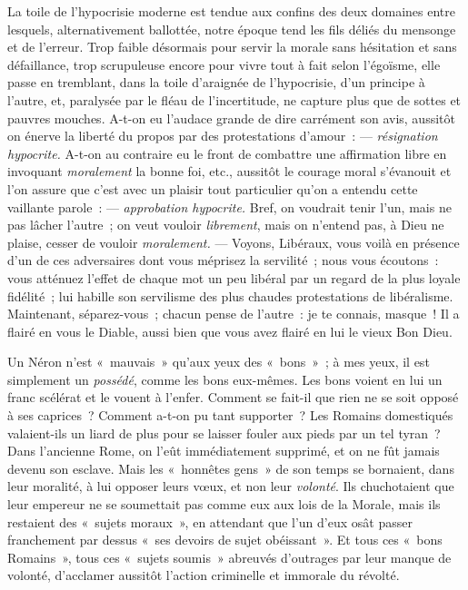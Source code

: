 \documentclass[french,twoside]{book} %
\begin{document}
La toile de l’hypocrisie moderne est tendue aux confins des deux domaines entre lesquels, alternativement ballottée, notre époque tend les fils déliés du mensonge et de l’erreur. Trop faible désormais pour servir la morale sans hésitation et sans défaillance, trop scrupuleuse encore pour vivre tout à fait selon l’égoïsme, elle passe en tremblant, dans la toile d’araignée de l’hypocrisie, d’un principe à l’autre, et, paralysée par le fléau de l’incertitude, ne capture plus que de sottes et pauvres mouches. A-t-on eu l’audace grande de dire carrément son avis, aussitôt on énerve la liberté du propos par des protestations d’amour : — \emph{résignation hypocrite.} A-t-on au contraire eu le front de combattre une affirmation libre en invoquant \emph{moralement} la bonne foi, etc., aussitôt le courage  moral s’évanouit et l’on assure que c’est avec un plaisir tout particulier qu’on a entendu cette vaillante parole : — \emph{approbation hypocrite.} Bref, on voudrait tenir l’un, mais ne pas lâcher l’autre ; on veut vouloir \emph{librement}, mais on n’entend pas, à Dieu ne plaise, cesser de vouloir \emph{moralement.} — Voyons, Libéraux, vous voilà en présence d’un de ces adversaires dont vous méprisez la servilité ; nous vous écoutons : vous atténuez l’effet de chaque mot un peu libéral par un regard de la plus loyale fidélité ; lui habille son servilisme des plus chaudes protestations de libéralisme. Maintenant, séparez-vous ; chacun pense de l’autre : je te connais, masque ! Il a flairé en vous le Diable, aussi bien que vous avez flairé en lui le vieux Bon Dieu.\par
Un Néron n’est « mauvais » qu’aux yeux des « bons » ; à mes yeux, il est simplement un \emph{possédé}, comme les bons eux-mêmes. Les bons voient en lui un franc scélérat et le vouent à l’enfer. Comment se fait-il que rien ne se soit opposé à ses caprices ? Comment a-t-on pu tant supporter ? Les Romains domestiqués valaient-ils un liard de plus pour se laisser fouler aux pieds par un tel tyran ? Dans l’ancienne Rome, on l’eût immédiatement supprimé, et on ne fût jamais devenu son esclave. Mais les « honnêtes gens » de son temps se bornaient, dans leur moralité, à lui opposer leurs vœux, et non leur \emph{volonté}. Ils chuchotaient que leur empereur ne se soumettait pas comme eux aux lois de la Morale, mais ils restaient des « sujets moraux », en attendant que l’un d’eux osât passer franchement par dessus « ses devoirs de sujet obéissant ». Et tous ces « bons Romains », tous ces « sujets soumis » abreuvés d’outrages par leur manque de volonté, d’acclamer aussitôt l’action criminelle et immorale du révolté.\par
\end{document}
